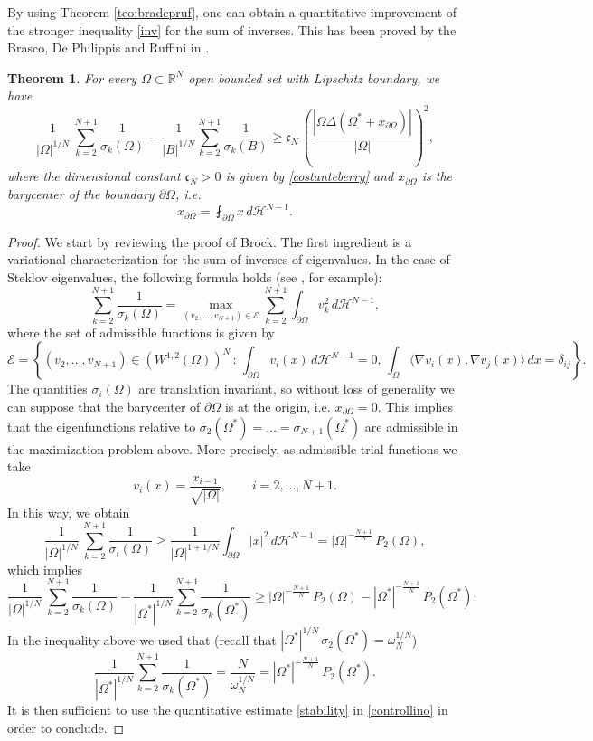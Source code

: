 \documentclass{amsart}
\newtheorem{theorem}[lemma]{Theorem}
\theoremstyle{definition}
\numberwithin{equation}{section}
\begin{document}
By using Theorem \ref{teo:bradepruf}, one can obtain a quantitative improvement of the stronger inequality \eqref{inv} for the sum of inverses. This has been proved by the Brasco, De Philippis and Ruffini in \cite[Theorem 5.1]{MR2913683}.
\begin{theorem}
For every $\Omega\subset\mathbb{R}^N$ open bounded set with Lipschitz boundary, we have
\begin{equation}
\label{inverso}
\frac{1}{|\Omega|^{1/N}}\,\sum\limits_{k=2}^{N+1} \frac{1}{\sigma_k(\Omega)}-\frac{1}{|B|^{1/N}}\sum\limits_{k=2}^{N+1} \frac{1}{\sigma_k(B)}
\ge \mathfrak{c}_{N}\, \left(\frac{|\Omega\Delta (\Omega^*+x_{\partial\Omega})|}{|\Omega|}\right)^2,
\end{equation}
where the dimensional constant $\mathfrak{c}_{N}>0$ is given by \eqref{costanteberry} and $x_{\partial\Omega}$ is the barycenter of the boundary $\partial\Omega$, i.e.
\[
x_{\partial\Omega}=\fint_{\partial \Omega} x\, d\mathcal H^{N-1}.
\]
\end{theorem}
\begin{proof}
We start by reviewing the proof of Brock. The first ingredient is a variational characterization for the sum of inverses of eigenvalues. In the case of Steklov eigenvalues, the following formula holds (see \cite[Theorem 1]{MR1251868}, for example):
\[
\sum\limits_{k=2}^{N+1} \frac{1}{\sigma_k(\Omega)}=\max\limits_{(v_2,\dots,v_{N+1})\in\mathcal{E}}\sum\limits_{k=2}^{N+1} \int_{\partial\Omega} v_k^2\, d\mathcal H^{N-1},
\]
where the set of admissible functions is given by 
\[
\mathcal{E}=\left\{(v_2,\dots,v_{N+1})\in (W^{1,2}(\Omega))^N\, :\, \int_{\partial\Omega} v_i(x)\, d\mathcal H^{N-1}=0,\, \int_{\Omega} \langle \nabla v_i(x),\nabla v_j(x)\rangle\, dx=\delta_{ij}\right\}.
\]
The quantities $\sigma_i(\Omega)$ are translation invariant, so without loss of generality we can suppose that the barycenter of $\partial \Omega$ is at the origin, i.e. $x_{\partial\Omega}=0$.
This implies that the eigenfunctions relative to $\sigma_2(\Omega^*)=\dots=\sigma_{N+1}(\Omega^*)$ are admissible in the maximization problem above. More precisely, as admissible trial functions we take 
\[
v_i(x)=\frac{x_{i-1}}{\sqrt{|\Omega|}}, \qquad i=2,\dots,N+1.
\] 
In this way, we obtain
\[
\frac{1}{|\Omega|^{1/N}}\,\sum\limits_{k=2}^{N+1} \frac{1}{\sigma_i(\Omega)}\ge \frac{1}{|\Omega|^{1+1/N}}\int_{\partial\Omega} |x|^2\, d\mathcal H^{N-1}=|\Omega|^{-\frac{N+1}{N}}\,P_2(\Omega),
\]
which implies
\begin{equation}
\label{controllino}
\frac{1}{|\Omega|^{1/N}}\,\sum\limits_{k=2}^{N+1} \frac{1}{\sigma_k(\Omega)}-\frac{1}{|\Omega^*|^{1/N}}\sum\limits_{k=2}^{N+1} \frac{1}{\sigma_k(\Omega^*)}\ge |\Omega|^{-\frac{N+1}{N}}\,P_2(\Omega)- |\Omega^*|^{-\frac{N+1}{N}}\,P_2(\Omega^*).
\end{equation}
In the inequality above we used that (recall that $|\Omega^*|^{1/N}\,\sigma_2(\Omega^*)=\omega_N^{1/N}$)
\[
\frac{1}{|\Omega^*|^{1/N}}\sum\limits_{k=2}^{N+1} \frac{1}{\sigma_k(\Omega^*)}=\frac{N}{\omega_N^{1/N}}=|\Omega^*|^{-\frac{N+1}{N}}\,P_2(\Omega^*).
\]
It is then sufficient to use the quantitative estimate \eqref{stability} in \eqref{controllino} in order to conclude.
\end{proof}
\end{document}
